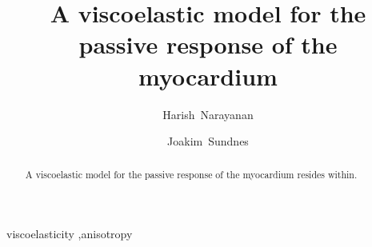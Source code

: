 \begin{frontmatter}

\title{A viscoelastic model for the passive response of the myocardium}

\author[srl]{Harish~Narayanan}
\author[srl]{Joakim~Sundnes}

\address[srl]{Center for Biomedical Computing, Simula Research
  Laboratory\\ P.O.~Box~134, 1325~Lysaker, Norway}

\begin{abstract}
  A viscoelastic model for the passive response of the myocardium
  resides within.
\end{abstract}

\begin{keyword}
viscoelasticity \sep anisotropy
\end{keyword}

\end{frontmatter}

%

